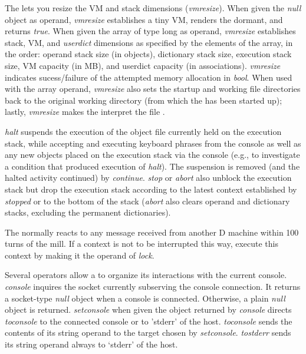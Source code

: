 The  lets you resize the VM and stack dimensions (\emph{vmresize}). When given the \emph{null} object as operand, \emph{vmresize} establishes a tiny VM, renders the  dormant, and returns \emph{true}. When given the array of type long as operand, \emph{vmresize} establishes stack, VM, and \emph{userdict} dimensions as specified by the elements of the array, in the order: operand stack size (in objects), dictionary stack size, execution stack size, VM capacity (in MB), and userdict capacity (in associations). \emph{vmresize} indicates sucess/failure of the attempted memory allocation in \emph{bool}. When used with the array operand, \emph{vmresize} also sets the startup and working file directories back to the original working directory (from which the  has been started up); lastly, \emph{vmresize} makes the  interpret the file . 

\emph{halt} suspends the execution of the object file currently held on the execution stack, while accepting and executing keyboard phrases from the console as well as any new objects placed on the execution stack via the console (e.g., to investigate a condition that produced execution of \emph{halt}). The suspension is removed (and the halted activity continued) by \emph{continue}. \emph{stop} or \emph{abort} also unblock the execution stack but drop the execution stack according to the latest context established by \emph{stopped} or to the bottom of the stack (\emph{abort} also clears operand and dictionary stacks, excluding the permanent dictionaries).

The  normally reacts to any message received from another D machine within 100 turns of the mill. If a context is not to be interrupted this way, execute this context by making it the operand of \emph{lock}.

Several operators allow a  to organize its interactions with the current console. \emph{console} inquires the socket currently subserving the console connection. It returns a socket-type \emph{null} object when a console is connected. Otherwise, a plain \emph{null} object is returned. \emph{setconsole} when given the object returned by \emph{console} directs \emph{toconsole} to the connected console or to 'stderr' of the  host. \emph{toconsole} sends the contents of its string operand to the target chosen by \emph{setconsole}. \emph{tostderr} sends its string operand always to `stderr' of the host.

